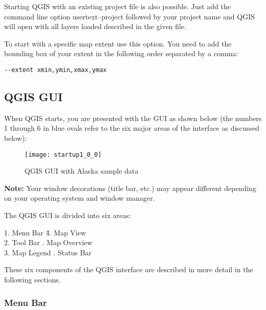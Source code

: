 Starting QGIS with an existing project file is also possible. Just
add the command line option usertext{--project} followed by your project name
and QGIS will open with all layers loaded described in the given file.

To start with a specific map extent use this option. You need to add the bounding
box of your extent in the following order separated by a comma:
\begin{verbatim}
--extent xmin,ymin,xmax,ymax
\end{verbatim}


\subsection{QGIS GUI}
\label{label_qgismainwindow}

When QGIS starts, you are presented with the GUI as shown below
(the numbers 1 through 6 in blue ovals refer to the six major areas of the
interface as discussed below):

\begin{figure}[ht]
   \begin{center}
   \caption{QGIS GUI with Alaska sample data \wincaption}
	 \label{fig:startup}
   \texttt{[image: startup1\_0\_0]}
\end{center} 
\end{figure}

\textbf{Note:} Your window decorations (title bar, etc.) may appear
different depending on your operating system and window manager.

The QGIS GUI is divided into six areas:

\begin{tabbing}
1. Menu Bar \hspace{3cm}\= 4. Map View \\
2. Tool Bar \hspace{3cm}. Map Overview  \\
3. Map Legend \hspace{3cm}. Status Bar   
\end{tabbing}

These six components of the QGIS interface are described in more detail in
the following sections.

\subsubsection{Menu Bar}\label{label_menubar}

